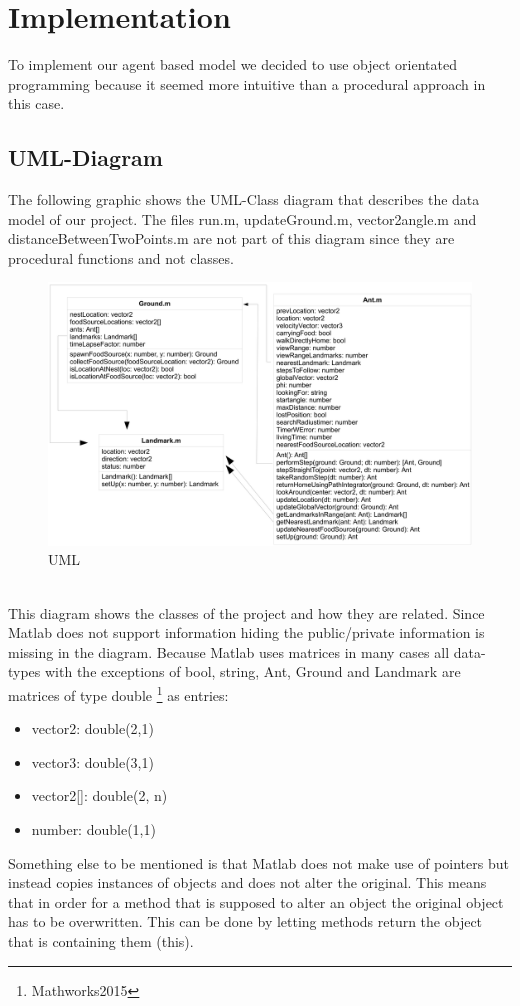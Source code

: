 \documentclass[11pt]{article}
\begin{document}
\section{Implementation}
To implement our agent based model we decided to use object orientated programming because it
seemed more intuitive than a procedural approach in this case.
\subsection{UML-Diagram}
The following graphic shows the UML-Class diagram that describes the data model of our project.
The files run.m, updateGround.m, vector2angle.m and distanceBetweenTwoPoints.m are not part of
this diagram since they are procedural functions and not classes.
\begin{figure}[h]
\includegraphics[scale=0.35]{./Pics/uml.png} 
\caption[UML]{UML}
\end{figure} \\
This diagram shows the classes of the project and how they are related. Since Matlab does not
support information hiding the public/private information is missing in the diagram. Because
 Matlab uses matrices in many cases all data-types with the exceptions of bool, string, Ant, Ground
and Landmark are matrices of type double \footnote{ Mathworks2015\cite{Mathworks2015}}  as entries:
\begin{itemize}
\item vector2: double(2,1)
\item vector3: double(3,1)
\item vector2[]: double(2, n)
\item number: double(1,1)
\end{itemize}
Something else to be mentioned is that Matlab does not make use of pointers but instead copies
instances of objects and does not alter the original. This means that in order for a method that is
supposed to alter an object the original object has to be overwritten. This can be done by letting
methods return the object that is containing them (this).
\end{document}
